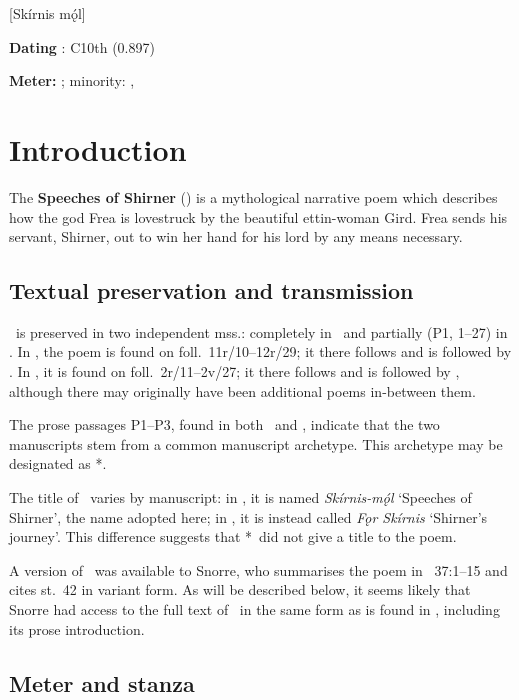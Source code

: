 [Skírnis mǫ́l]

\begin{flushright}%
\textbf{Dating} \parencite{Sapp2022}: C10th (0.897)

\textbf{Meter:} \Ljodahattr; minority: \Galdralag, \Malahattr%
\end{flushright}

\section{Introduction}

The \textbf{Speeches of Shirner} (\Skirnismal) is a mythological narrative poem which describes how the god Frea is lovestruck by the beautiful ettin-woman Gird.  Frea sends his servant, Shirner, out to win her hand for his lord by any means necessary.

\subsection{Textual preservation and transmission}

\Skirnismal\ is preserved in two independent mss.: completely in \Regius\ and partially (P1, 1--27) in \AM.  In \Regius, the poem is found on foll.~11r/10--12r/29; it there follows  and is followed by .  In \AM, it is found on foll.~2r/11--2v/27; it there follows  and is followed by , although there may originally have been additional poems in-between them.

The prose passages P1--P3, found in both \Regius\ and \AM, indicate that the two manuscripts stem from a common manuscript archetype.  This archetype may be designated as *\Regius\AM.

The title of \Skirnismal\ varies by manuscript: in \AM, it is named \emph{Skírnis-mǫ́l} ‘Speeches of Shirner’, the name adopted here; in \Regius, it is instead called \emph{Fǫr Skírnis} ‘Shirner’s journey’.  This difference suggests that *\Regius\AM\ did not give a title to the poem.

A version of \Skirnismal\ was available to Snorre, who summarises the poem in \Gylfaginning~37:1--15 and cites st.~42 in variant form.  As will be described below, it seems likely that Snorre had access to the full text of \Skirnismal\ in the same form as is found in \Regius\AM, including its prose introduction.

\subsection{Meter and stanza}

